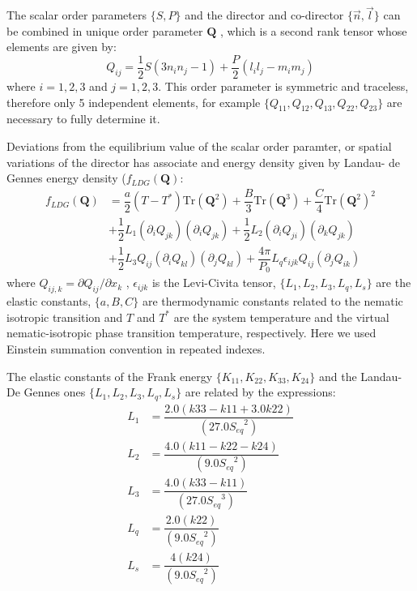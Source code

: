 \documentclass[final,5p,times,twocolumn]{elsarticle}
\begin{document}
The scalar order parameters $\lbrace S, P \rbrace$ and the director
and co-director $\lbrace \vec{n}, \vec{l} \rbrace$ can be combined in
unique order parameter $\mathbf{Q}$ , which is a second rank tensor whose
elements are given by:
\begin{equation}\label{eq:tensorial_parameter}
  Q_{ij}=\dfrac{1}{2} S ( 3 n_{i} n_{j}- 1) + \dfrac{P}{2} (l_i l_j - m_i m_j)
\end{equation}
where $i=1,2,3$ and $j=1,2,3$.  This order parameter is symmetric and traceless, therefore only 5 independent elements, for example $\lbrace Q_{11}, Q_{12},Q_{13}, Q_{22}, Q_{23} \rbrace $ are necessary to fully determine it.

Deviations from the equilibrium value of the scalar order paramter, or
spatial variations of the director has associate and energy density
given by Landau- de Gennes energy density ($f_{LDG}(\mathbf{Q})$:
\begin{align}\label{eq:Landau_deGennes} \nonumber
  f_{LDG}(\mathbf{Q})&=\dfrac{a}{2}(T-T^*) \text{Tr}(\mathbf{Q}^2) +
                       \dfrac{B}{3} \text{Tr}(\mathbf{Q}^3)
                       +  \dfrac{C}{4} \text{Tr}(\mathbf{Q}^2)^2 \\ \nonumber
                     &+ \dfrac{1}{2} L_1 \left( \partial_i Q_{jk} \right)
                       \left( \partial_i Q_{jk} \right) + \dfrac{1}{2} L_2
                       \left( \partial_i Q_{ji} \right) \left( \partial_k Q_{jk} \right) \\
                     &+\dfrac{1}{2} L_3 Q_{ij}\left( \partial_i Q_{kl}\right) \left(\partial_j Q_{kl}\right)  + \dfrac{4 \pi}{P_0} L_q \epsilon_{ijk} Q_{ij}\left( \partial_j Q_{ik} \right)                     
\end{align}
%
where $Q_{ij,k}= \partial Q_{ij}/\partial x_k$ , $\epsilon_{ijk}$ is
the Levi-Civita tensor, $\lbrace L_1 ,L_2,L_3, L_q, L_s \rbrace$ are
the elastic constants, $\lbrace a,B,C \rbrace$ are thermodynamic
constants related to the nematic isotropic transition and $T$ and
$T^*$ are the system temperature and the virtual nematic-isotropic
phase transition temperature, respectively. Here we used Einstein
summation convention in repeated indexes.

The elastic constants of the Frank energy $\lbrace K_{11}, K_{22}, K_{33}, K_{24} \rbrace$ and the Landau-De Gennes ones $\lbrace L_1 ,L_2,L_3, L_q, L_s \rbrace$ are related by the expressions:
\begin{align}\label{eq:frank_to_ldg} \nonumber
L_1&=\dfrac{2.0 (k33-k11+3.0 k22)}{(27.0 {S_{eq}}^2)}\\\nonumber
L_2&=\dfrac{4.0 (k11-k22-k24)}{(9.0 {S_{eq}}^2)}\\\nonumber
L_3&=\dfrac{4.0 (k33-k11)}{(27.0 {S_{eq}}^3 )}\\\nonumber
L_q&=\dfrac{2.0 (k22)}{(9.0 {S_{eq}}^2)}\\
L_s&=\dfrac{4 (k24)}{(9.0 {S_{eq}}^2)}
\end{align}
\end{document}

